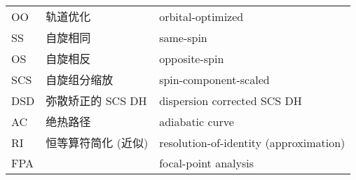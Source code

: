 \begin{longtable}{lll}
    OO & 轨道优化 & orbital-optimized \\
    SS & 自旋相同 & same-spin \\
    OS & 自旋相反 & opposite-spin \\
    SCS & 自旋组分缩放 & spin-component-scaled \\
    DSD & 弥散矫正的 SCS DH & dispersion corrected SCS DH \\
    AC & 绝热路径 & adiabatic curve \\
    RI & 恒等算符简化 (近似) & resolution-of-identity (approximation) \\
    FPA & & focal-point analysis \\
\end{longtable}
